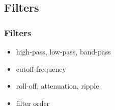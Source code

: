 
\subsection{Filters}

\begin{frame}
	\frametitle{Filters}
	\begin{itemize}
		\item high-pass, low-pass, band-pass
		\item cutoff frequency
		\item roll-off, attenuation, ripple
		\item filter order
	\end{itemize}
\end{frame}

